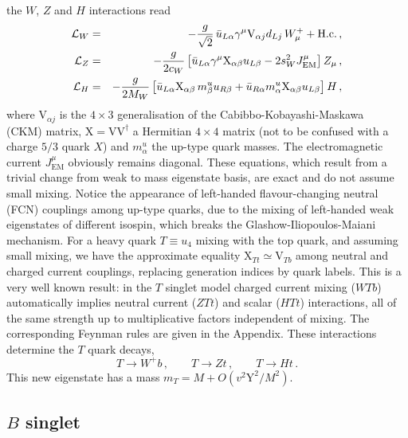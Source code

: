 \documentclass[12pt,a4paper]{article}
\newcommand{\gm}{\gamma^\mu}
\newcommand{\Wmp}{W_\mu^+}
\newcommand{\Zm}{Z_\mu}
\begin{document}
the $W$, $Z$ and $H$ interactions read
\begin{eqnarray}
\mathcal{L}_W & = & -\frac{g}{\sqrt 2} \, \bar u_{L \alpha} \gm \mathrm{V}_{\alpha j} d_{Lj} \, \Wmp + \text{H.c.} \,, \notag \\
%
\mathcal{L}_Z & = & -\frac{g}{2 c_W} \left[ \bar u_{L\alpha} \gm \mathrm{X}_{\alpha \beta} u_{L\beta} - 2 s_W^2 J_\text{EM}^\mu \right] \Zm \,, \notag \\
%
\mathcal{L}_H & = & - \frac{g}{2 M_W} \left[
\bar u_{L\alpha} \mathrm{X}_{\alpha \beta} \, m^u_\beta u_{R\beta} + \bar u_{R\alpha} m^u_\alpha \mathrm{X}_{\alpha \beta} u_{L\beta} \right] H \,,
\label{ec:Tint}
\end{eqnarray}
where $\mathrm{V}_{\alpha j}$ is the $4 \times 3$ generalisation of the Cabibbo-Kobayashi-Maskawa~\cite{Cabibbo:1963yz,Kobayashi:1973fv} (CKM) matrix, $\mathrm{X} = \mathrm{V} \mathrm{V}^\dagger$ a Hermitian $4 \times 4$ matrix (not to be confused with a charge $5/3$ quark $X$) and $m_\alpha^u$ the up-type quark masses. The electromagnetic current $J_\text{EM}^\mu$ obviously remains diagonal.
These equations, which result from a trivial change from weak to mass eigenstate basis, are exact and do not assume small mixing.
Notice the appearance of left-handed flavour-changing neutral (FCN) couplings among up-type quarks, due to the mixing of left-handed weak eigenstates of different isospin, which breaks the Glashow-Iliopoulos-Maiani~\cite{Glashow:1970gm} mechanism.
For a heavy quark $T \equiv u_4$ mixing with the top quark, and assuming small mixing, we have the approximate equality $\mathrm{X}_{Tt} \simeq \mathrm{V}_{Tb}$ among neutral and charged current couplings, replacing generation indices by quark labels. This is a very well known result: in the $T$ singlet model charged current mixing ($WTb$) automatically implies neutral current ($ZTt$) and scalar ($HTt$) interactions, all of the same strength up to multiplicative factors independent of mixing. The corresponding Feynman rules are given in the Appendix. These interactions determine the $T$ quark decays,
\begin{equation}
T \to W^+ b \,,\quad \quad T \to Zt \,,\quad \quad T \to Ht \,.
\end{equation}
This new eigenstate has a mass $m_T = M + O(v^2 \mathrm{Y}^2/M^2)$.




\subsection{$B$ singlet}
\label{sec:2.2}
\end{document}
